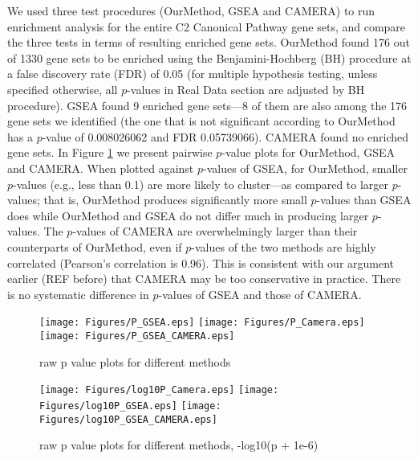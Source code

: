\documentclass[11pt, a4paper]{article}
\begin{document}
		 
		 We used three test procedures (OurMethod, GSEA and CAMERA) to run enrichment analysis for the entire C2 Canonical Pathway gene sets, and compare the three tests in terms of resulting enriched gene sets. OurMethod found 176 out of 1330 gene sets to be enriched using the Benjamini-Hochberg (BH) procedure at a false discovery rate (FDR) of 0.05 (for multiple hypothesis testing, unless specified otherwise, all $p$-values in Real Data section are adjusted by BH procedure). GSEA found 9 enriched gene sets---8 of them are also among the 176 gene sets we identified (the one that is not significant according to OurMethod has a $p$-value of 0.008026062 and FDR 0.05739066). CAMERA found no enriched gene sets. In Figure \ref{fig:HDdatap} we present pairwise $p$-value plots for OurMethod, GSEA and CAMERA. When plotted against $p$-values of GSEA, for OurMethod, smaller $p$-values (e.g., less than 0.1) are more likely to cluster---as compared to larger $p$-values; that is, OurMethod produces significantly more small $p$-values than GSEA does while OurMethod and GSEA do not differ much in producing larger $p$-values.
		 The $p$-values of CAMERA are overwhelmingly larger than their counterparts of OurMethod, even if $p$-values of the two methods are highly correlated (Pearson's correlation is 0.96). This is consistent with our argument earlier (REF before) that CAMERA may be too conservative in practice. There is no systematic difference in $p$-values of GSEA and those of CAMERA. 
		 		 	\begin{figure}[H]
		 		 		\caption{raw p value plots for different methods}\label{fig:HDdatap}
		 		 		\begin{center}
		 		 			\texttt{[image: Figures/P\_GSEA.eps]}
		 		 			\texttt{[image: Figures/P\_Camera.eps]}
		 		 			\texttt{[image: Figures/P\_GSEA\_CAMERA.eps]}
		 		 		\end{center} 
		 		 	\end{figure} 
		 		 	
		 		 	\begin{figure}[H]
		 		 		\caption{raw p value plots for different methods, -log10(p  + 1e-6)}\label{fig:HDdatalog10p}
		 		 		\begin{center}
		 		 			\texttt{[image: Figures/log10P\_Camera.eps]}
		 		 			\texttt{[image: Figures/log10P\_GSEA.eps]}
		 		 			\texttt{[image: Figures/log10P\_GSEA\_CAMERA.eps]}
		 		 		\end{center} 
		 		 	\end{figure} 
		 		 	
\end{document}
